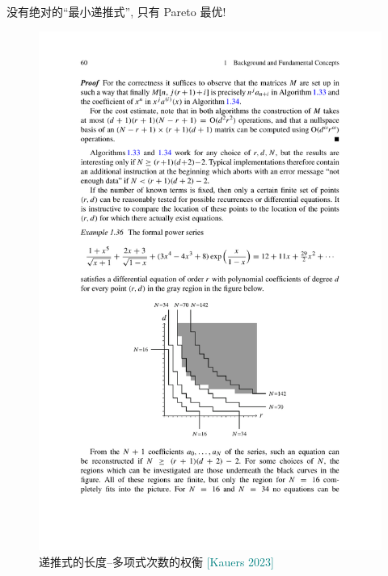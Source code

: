 \documentclass{ctexbeamer}
\newcommand{\cnote}[2][\footnotesize]{\textcolor{teal}{#1[#2]}}
\begin{document}
\begin{frame}
  没有绝对的``最小递推式'', 只有 Pareto 最优!
  \begin{figure}
    \centering
    \includegraphics[scale=0.7, clip, trim=0.5cm 5cm 0.5cm 8.8cm]{Kauers.pdf}
    \caption{递推式的长度--多项式次数的权衡 \cnote{Kauers 2023}}
  \end{figure}

\end{frame}
\end{document}
